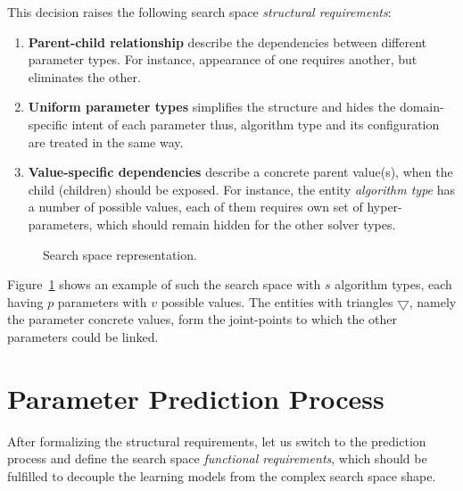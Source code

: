 This decision raises the following search space \emph{structural requirements}:
\begin{enumerate}[itemsep=8pt]
	\item[S.R.1] \textbf{Parent-child relationship} describe the dependencies between different parameter types. For instance, appearance of one requires another, but eliminates the other.

	\item[S.R.2] \textbf{Uniform parameter types} simplifies the structure and hides the domain-specific intent of each parameter thus, algorithm type and its configuration are treated in the same way.

	\item[S.R.3] \textbf{Value-specific dependencies} describe a concrete parent value(s), when the child (children) should be exposed. For instance, the entity \textit{algorithm type} has a number of possible values, each of them requires own set of hyper-parameters, which should remain hidden for the other solver types.
\end{enumerate}

\begin{figure}
	\centering
	
	\caption{Search space representation.}
	\label{concept:pict:Search Space Representation}
\end{figure}

Figure~\ref{concept:pict:Search Space Representation} shows an example of such the search space with $s$ algorithm types, each having $p$ parameters with $v$ possible values. The entities with triangles $\bigtriangledown$, namely the parameter concrete values, form the joint-points to which the other parameters could be linked. 


\section{Parameter Prediction Process}\label{concept:prediction}

After formalizing the structural requirements, let us switch to the prediction process and define the search space \emph{functional requirements}, which should be fulfilled to decouple the learning models from the complex search space shape.

